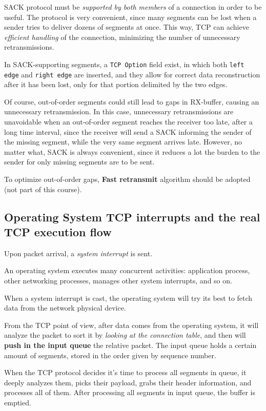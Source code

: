 \documentclass[10pt]{extreport}
\begin{document}
SACK protocol must be \emph{supported by both members} of a connection in order
to be useful. The protocol is very convenient, since many segments can be lost
when a sender tries to deliver dozens of segments at once. This way, TCP can
achieve \emph{efficient handling} of the connection, minimizing the number of
unnecessary retransmissions.

In SACK\--supporting segments, a \texttt{TCP Option} field exist, in which both
\texttt{left edge} and \texttt{right edge} are inserted, and they allow for
correct data reconstruction after it has been lost, only for that portion
delimited by the two edges.

Of course, out-of-order segments could still lead to gaps in RX-buffer, causing
an unnecessary retransmission. In this case, unnecessary retransmissions are
unavoidable when an out-of-order segment reaches the receiver too late, after a
long time interval, since the receiver will send a SACK informing the sender of
the missing segment, while the very same segment arrives late. However, no
matter what, SACK is always convenient, since it reduces a lot the burden to
the sender for only missing segments are to be sent.

To optimize out-of-order gaps, \textbf{Fast retransmit} algorithm should be
adopted (not part of this course).

\subsection{Operating System TCP interrupts and the real TCP execution flow}

Upon packet arrival, a \emph{system interrupt} is sent. 

An operating system executes many concurrent activities: application process, other networking processes, manages other system interrupts, and so on.

When a system interrupt is cast, the operating system will try its best to fetch data from the network physical device.

From the TCP point of view, after data comes from the operating system, it will
analyze the packet to sort it by \emph{looking at the connection table}, and
then will \textbf{push in the input queue} the relative packet. The input
queue holds a certain amount of segments, stored in the order given by sequence
number.

When the TCP protocol decides it's time to process all segments in queue, it
deeply analyzes them, picks their payload, grabs their header information, and
processes all of them. After processing all segments in input queue, the buffer
is emptied.
\end{document}
